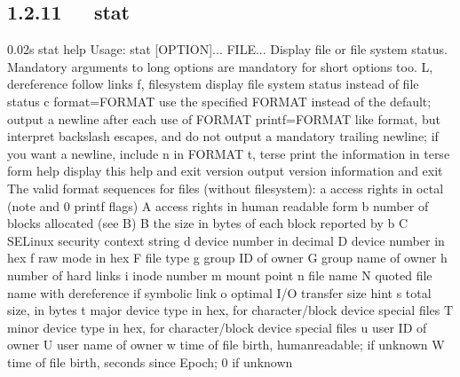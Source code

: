 \documentclass[letterpaper,12pt,english]{sphinxmanual}
\begin{document}
\subsection{1.2.11   stat}
\label{\detokenize{001software/001install/linux:stat}}
\begin{sphinxVerbatim}[commandchars=\\\{\}]
0.02s\PYGZdl{} stat \PYGZhy{}\PYGZhy{}help
Usage: stat [OPTION]... FILE...
Display file or file system status.
Mandatory arguments to long options are mandatory for short options too.
  \PYGZhy{}L, \PYGZhy{}\PYGZhy{}dereference     follow links
  \PYGZhy{}f, \PYGZhy{}\PYGZhy{}file\PYGZhy{}system     display file system status instead of file status
  \PYGZhy{}c  \PYGZhy{}\PYGZhy{}format=FORMAT   use the specified FORMAT instead of the default;
                          output a newline after each use of FORMAT
      \PYGZhy{}\PYGZhy{}printf=FORMAT   like \PYGZhy{}\PYGZhy{}format, but interpret backslash escapes,
                          and do not output a mandatory trailing newline;
                          if you want a newline, include \PYGZbs{}n in FORMAT
  \PYGZhy{}t, \PYGZhy{}\PYGZhy{}terse           print the information in terse form
      \PYGZhy{}\PYGZhy{}help     display this help and exit
      \PYGZhy{}\PYGZhy{}version  output version information and exit
The valid format sequences for files (without \PYGZhy{}\PYGZhy{}file\PYGZhy{}system):
  \PYGZpc{}a   access rights in octal (note \PYGZsq{}\PYGZsh{}\PYGZsq{} and \PYGZsq{}0\PYGZsq{} printf flags)
  \PYGZpc{}A   access rights in human readable form
  \PYGZpc{}b   number of blocks allocated (see \PYGZpc{}B)
  \PYGZpc{}B   the size in bytes of each block reported by \PYGZpc{}b
  \PYGZpc{}C   SELinux security context string
  \PYGZpc{}d   device number in decimal
  \PYGZpc{}D   device number in hex
  \PYGZpc{}f   raw mode in hex
  \PYGZpc{}F   file type
  \PYGZpc{}g   group ID of owner
  \PYGZpc{}G   group name of owner
  \PYGZpc{}h   number of hard links
  \PYGZpc{}i   inode number
  \PYGZpc{}m   mount point
  \PYGZpc{}n   file name
  \PYGZpc{}N   quoted file name with dereference if symbolic link
  \PYGZpc{}o   optimal I/O transfer size hint
  \PYGZpc{}s   total size, in bytes
  \PYGZpc{}t   major device type in hex, for character/block device special files
  \PYGZpc{}T   minor device type in hex, for character/block device special files
  \PYGZpc{}u   user ID of owner
  \PYGZpc{}U   user name of owner
  \PYGZpc{}w   time of file birth, human\PYGZhy{}readable; \PYGZhy{} if unknown
  \PYGZpc{}W   time of file birth, seconds since Epoch; 0 if unknown

\end{sphinxVerbatim}
\end{document}
